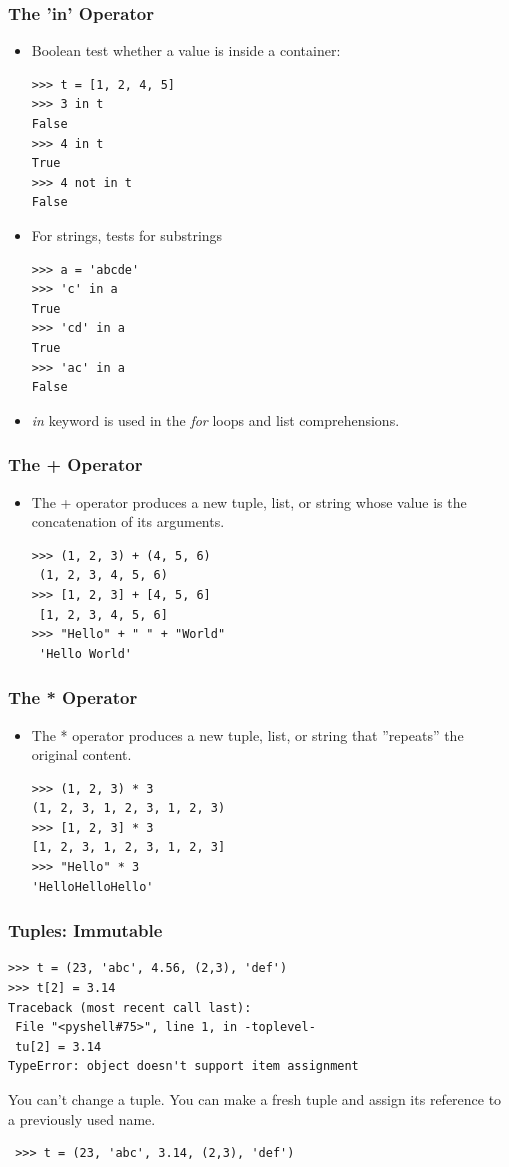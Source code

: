 \documentclass[12pt,handout]{beamer}
\begin{document}
\begin{frame}[fragile]
\frametitle{The 'in' Operator}
\begin{itemize}
\item Boolean test whether a value is inside a container:
\small{
\begin{verbatim}
>>> t = [1, 2, 4, 5]
>>> 3 in t
False
>>> 4 in t
True
>>> 4 not in t
False
\end{verbatim}
}
\item For strings, tests for substrings
\small{
\begin{verbatim}
>>> a = 'abcde'
>>> 'c' in a
True
>>> 'cd' in a
True
>>> 'ac' in a
False
\end{verbatim}
}
\item {\it in} keyword is used in the {\it for} loops
and list comprehensions.
\end{itemize}
\end{frame}


\begin{frame}[fragile]
\frametitle{The + Operator}
\begin{itemize}
\item The + operator produces a new tuple, list, or string whose
value is the concatenation of its arguments.
\small{
\begin{verbatim}
>>> (1, 2, 3) + (4, 5, 6)
 (1, 2, 3, 4, 5, 6)
>>> [1, 2, 3] + [4, 5, 6]
 [1, 2, 3, 4, 5, 6]
>>> "Hello" + " " + "World"
 'Hello World'
\end{verbatim}
}
\end{itemize}
\end{frame}


\begin{frame}[fragile]
\frametitle{The * Operator}
\begin{itemize}
\item The * operator produces a new tuple, list, or string that
''repeats'' the original content.
\small{
\begin{verbatim}
>>> (1, 2, 3) * 3
(1, 2, 3, 1, 2, 3, 1, 2, 3)
>>> [1, 2, 3] * 3
[1, 2, 3, 1, 2, 3, 1, 2, 3]
>>> "Hello" * 3
'HelloHelloHello'
\end{verbatim}
}
\end{itemize}
\end{frame}


\begin{frame}[fragile]
\frametitle{Tuples: Immutable}
\small{
\begin{verbatim}
>>> t = (23, 'abc', 4.56, (2,3), 'def')
>>> t[2] = 3.14
Traceback (most recent call last):
 File "<pyshell#75>", line 1, in -toplevel-
 tu[2] = 3.14
TypeError: object doesn't support item assignment
\end{verbatim}
}
You can't change a tuple.
You can make a fresh tuple and assign its reference to a previously used
name.
\small{
\begin{verbatim}
 >>> t = (23, 'abc', 3.14, (2,3), 'def')
\end{verbatim}
}
\end{frame}
\end{document}
